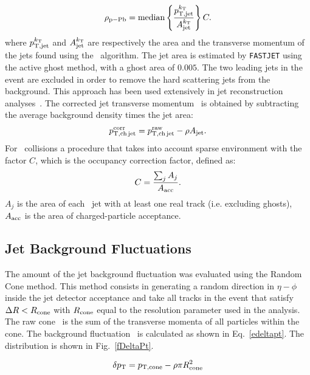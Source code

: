 \begin{equation}
\label{eq_rho_pPB}
\rho_{\rm p-Pb} = {\rm median}\left\{\frac{p_{\rm T,jet}^{k_{\mathrm{T}}}}{A_{\rm jet}^{k_{\mathrm{T}}}}\right\} C.
\end{equation}
where $p_{\rm T,jet}^{k_{\mathrm{T}}}$ and $A_{\rm jet}^{k_{\mathrm{T}}}$ are respectively the area and the transverse momentum of
the jets found using the \kt\ algorithm. 
The jet area is estimated by \texttt{FASTJET} using the active ghost method, with a ghost area of $0.005$.
The two leading jets in the event are excluded in order to remove the hard scattering jets from the background.
This approach has been used extensively in jet reconstruction analyses~\cite{ALICE:2014a, ALICE:2015a}.
The corrected jet transverse momentum \ptchjetcorr\ is obtained by subtracting the average background density times the jet area:
\begin{equation}
\label{eq_jet_backsub}
p_{\mathrm{T,ch\,jet}}^{\mathrm{corr}} = p_{\mathrm{T,ch\,jet}}^{\mathrm{raw}} - \rho A_{\rm jet}.
\end{equation}
For \pPb\ collisions a procedure that takes into account sparse environment with the factor $C$, which is the occupancy correction factor, defined as:
\begin{equation}
\label{eq_Cfac}
C = \frac{\sum_{j}A_{j}}{A_{\rm acc}}.
\end{equation}
$A_{j}$ is the area of each \kt\ jet with at least one real track (i.e. excluding ghosts), $A_{\rm acc}$ is the area of charged-particle acceptance.

\subsection{Jet Background Fluctuations}
\label{sBackFluc}
The amount of the jet background fluctuation was evaluated using the Random Cone method.
This method consists in generating a random direction in $\eta-\phi$ inside the jet detector acceptance and 
take all tracks in the event that satisfy $\Delta R<R_{\rm cone}$ with $R_{\rm cone}$ equal to the resolution parameter used in the analysis. 
The raw cone \pt\ is the sum of the transverse momenta of all particles within the cone.
The background fluctuation \deltapt\ is calculated  as shown in Eq.~\ref{edeltapt}.
The distribution is shown in Fig.~\ref{fDeltaPt}.  

\begin{equation}
\delta p_{\rm T} = p_{\rm T, cone} - \rho \pi R_{\rm cone}^{2}
\label{edeltapt}
\end{equation}

